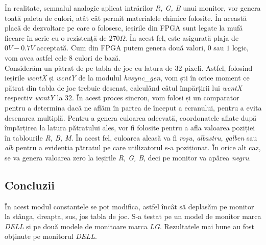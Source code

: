 \documentclass[12pt,twoside,a4paper,fleqn]{book}
\theoremstyle{definition}
\begin{document}
În realitate, semnalul analogic aplicat intrărilor \emph{R, G, B} unui monitor, vor genera toată paleta de culori, atât cât permit materialele chimice folosite. În această placă de dezvoltare pe care o folosesc, ieșirile din FPGA sunt legate la mufă fiecare în serie cu o rezistență de $270\Omega$. În acest fel, este asigurată plaja de $0V - 0.7V$ acceptată. Cum din FPGA putem genera două valori, $0$ sau $1$ logic, vom avea astfel cele $8$ culori de bază.\\
Considerăm un pătrat de pe tabla de joc cu latura de $32$ pixeli. Astfel, folosind ieșirile \emph{wcntX} și \emph{wcntY} de la modulul \emph{hvsync\_gen}, vom ști în orice moment ce pătrat din tabla de joc trebuie desenat, calculând câtul împărțirii lui \emph{wcntX} respectiv \emph{wcntY} la $32$. În acest proces sincron, vom folosi și un comparator pentru a determina dacă ne aflăm în partea de început a ecranului, pentru a evita desenarea multiplă. Pentru a genera culoarea adecvată, coordonatele aflate după împărțirea la latura pătratului ales, vor fi folosite pentru a afla valoarea poziției în tablourile \emph{R, B, M}. În acest fel, culoarea aleasă va fi \emph{roșu}, \emph{albastru}, \emph{galben} sau \emph{alb} pentru a evidenția pătratul pe care utilizatorul s-a poziționat. În orice alt caz, se va genera valoarea zero la ieșirile \emph{R, G, B}, deci pe monitor va apărea \emph{negru}.
\subsection{Concluzii}
În acest modul constantele se pot modifica, astfel încât să deplasăm pe monitor la stânga, dreapta, sus, jos tabla de joc. S-a testat pe un model de monitor marca \emph{DELL} și pe două modele de monitoare marca \emph{LG}. Rezultatele mai bune au fost obținute pe monitorul \emph{DELL}.
\end{document}
